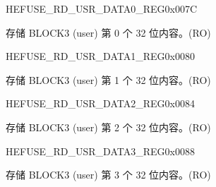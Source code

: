 \begin{register}{H}{EFUSE\_RD\_USR\_DATA0\_REG}{0x007C}\label{regdesc:EFUSERDUSRDATA0REG}
%
\regnewline%
\begin{regdesc}\begin{reglist}
\label{fielddesc:EFUSEUSRDATA0}\item [EFUSE\_USR\_DATA0] 存储 BLOCK3 (user) 第 0 个 32 位内容。(RO)
\end{reglist}\end{regdesc}
\end{register}


\begin{register}{H}{EFUSE\_RD\_USR\_DATA1\_REG}{0x0080}\label{regdesc:EFUSERDUSRDATA1REG}
%
\regnewline%
\begin{regdesc}\begin{reglist}
\label{fielddesc:EFUSEUSRDATA1}\item [EFUSE\_USR\_DATA1] 存储 BLOCK3 (user) 第 1 个 32 位内容。(RO)
\end{reglist}\end{regdesc}
\end{register}


\begin{register}{H}{EFUSE\_RD\_USR\_DATA2\_REG}{0x0084}\label{regdesc:EFUSERDUSRDATA2REG}
%
\regnewline%
\begin{regdesc}\begin{reglist}
\label{fielddesc:EFUSEUSRDATA2}\item [EFUSE\_USR\_DATA2] 存储 BLOCK3 (user) 第 2 个 32 位内容。(RO)
\end{reglist}\end{regdesc}
\end{register}


\begin{register}{H}{EFUSE\_RD\_USR\_DATA3\_REG}{0x0088}\label{regdesc:EFUSERDUSRDATA3REG}
%
\regnewline%
\begin{regdesc}\begin{reglist}
\label{fielddesc:EFUSEUSRDATA3}\item [EFUSE\_USR\_DATA3] 存储 BLOCK3 (user) 第 3 个 32 位内容。(RO)
\end{reglist}\end{regdesc}
\end{register}


